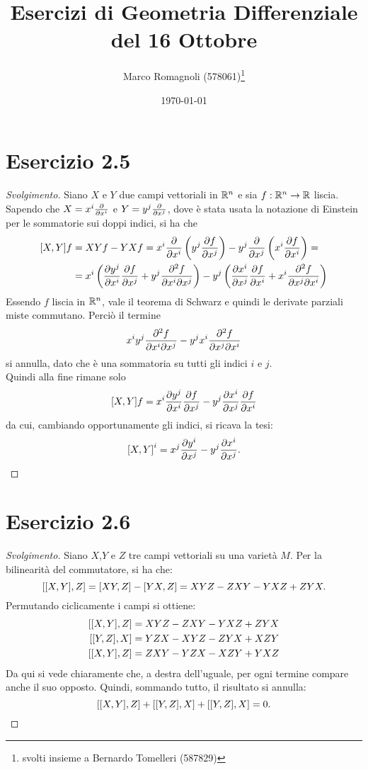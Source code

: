 \documentclass[italian,a4paper,11pt]{article}
\title{Esercizi di Geometria Differenziale\\ del 16 Ottobre}
\author{Marco Romagnoli (578061)\thanks{svolti insieme a Bernardo Tomelleri (587829)}}
\date{\today}
\begin{document}
\maketitle

\section*{Esercizio 2.5}
\begin{proof}[Svolgimento]
Siano $X$ e $Y$ due campi vettoriali in $\mathbb R^n$ e sia $f:\mathbb R^n \rightarrow \mathbb R$ liscia. Sapendo che $X = x^i \pdv{}{x^i}$ e $Y = y^j \pdv{}{x^j}$, dove è stata usata la notazione di Einstein per le sommatorie sui doppi indici, si ha che 
\begin{align*}
\comm{X}{Y}f &= XYf - YXf = x^i \pdv{}{x^i}\left(y^j \pdv{f}{x^j}\right) - y^j \pdv{}{x^j}\left(x^i \pdv{f}{x^i}\right) = \\
&= x^i \left(\pdv{y^j}{x^i} \pdv{f}{x^j} + y^j \pdv[2]{f}{x^i}{x^j}\right) - y^j \left(\pdv{x^i}{x^j} \pdv{f}{x^i} + x^i \pdv[2]{f}{x^j}{x^i}\right)
\end{align*}
Essendo $f$ liscia in $\mathbb R^n$, vale il teorema di Schwarz e quindi le derivate parziali miste commutano. Perciò il termine $$x^iy^j  \pdv[2]{f}{x^i}{x^j} - y^jx^i  \pdv[2]{f}{x^j}{x^i}$$ si annulla, dato che è una sommatoria su tutti gli indici $i$ e $j$.\\
Quindi alla fine rimane solo $$\comm{X}{Y}f = x^i \pdv{y^j}{x^i} \pdv{f}{x^j} - y^j \pdv{x^i}{x^j} \pdv{f}{x^i}$$ da cui, cambiando opportunamente gli indici, si ricava la tesi: $$\comm{X}{Y}^i = x^j \pdv{y^i}{x^j} - y^j \pdv{x^i}{x^j}.$$  
\end{proof}

\section*{Esercizio 2.6}
\begin{proof}[Svolgimento]
Siano $X$,$Y$ e $Z$ tre campi vettoriali su una varietà $M$. Per la bilinearità del commutatore, si ha che:
\begin{equation*}
\comm{\comm{X}{Y}}{Z} = \comm{XY}{Z} - \comm{YX}{Z} = XYZ - ZXY - YXZ + ZYX.
\end{equation*}
Permutando ciclicamente i campi si ottiene:
\begin{align*}
\comm{\comm{X}{Y}}{Z} &= XYZ - ZXY - YXZ + ZYX\\
\comm{\comm{Y}{Z}}{X} &= YZX - XYZ - ZYX + XZY\\
\comm{\comm{X}{Y}}{Z} &= ZXY - YZX - XZY + YXZ
\end{align*}
Da qui si vede chiaramente che, a destra dell'uguale, per ogni termine compare anche il suo opposto. Quindi, sommando tutto, il risultato si annulla: $$\comm{\comm{X}{Y}}{Z} + \comm{\comm{Y}{Z}}{X} + \comm{\comm{Y}{Z}}{X} = 0.$$ 
\end{proof}
\end{document}
